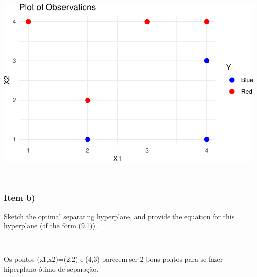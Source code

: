 \documentclass[
  a4paperpaper,
]{article}
\begin{document}
\includegraphics{lista-5_files/figure-pdf/unnamed-chunk-7-1.pdf}

~

\subsubsection{Item b)}\label{item-b-2}

Sketch the optimal separating hyperplane, and provide the equation for
this hyperplane (of the form (9.1)).

~

Os pontos (x1,x2)=(2,2) e (4,3) parecem ser 2 bons pontos para se fazer
hiperplano ótimo de separação.
\end{document}
